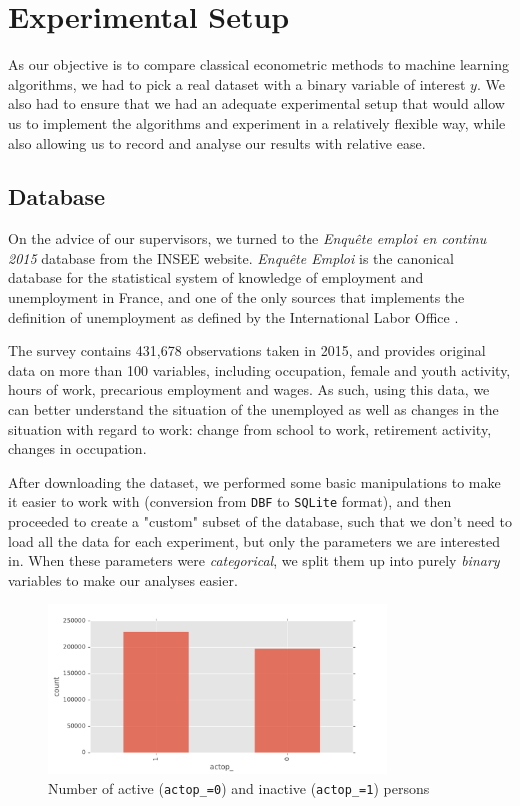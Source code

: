 \chapter{Experimental Setup}

As our objective is to compare classical econometric methods to machine learning algorithms, we had to pick a real dataset with a binary variable of interest $y$. We also had to ensure that we had an adequate experimental setup that would allow us to implement the algorithms and experiment in a relatively flexible way, while also allowing us to record and analyse our results with relative ease.

\section{Database}
On the advice of our supervisors, we turned to the \textit{Enqu\^ete emploi en continu 2015} database \cite{enquete} from the INSEE website. \textit{Enqu\^ete Emploi} is the canonical database for the statistical system of knowledge of employment and unemployment in France, and one of the only sources that implements the definition of unemployment as defined by the International Labor Office \cite{ilo}.

The survey contains 431,678 observations taken in 2015, and provides original data on more than 100 variables, including occupation, female and youth activity, hours of work, precarious employment and wages. As such, using this data, we can better understand the situation of the unemployed as well as changes in the situation with regard to work: change from school to work, retirement activity, changes in occupation.

After downloading the dataset, we performed some basic manipulations to make it easier to work with (conversion from \texttt{DBF} to \texttt{SQLite} format), and then proceeded to create a "custom" subset of the database, such that we don't need to load all the data for each experiment, but only the parameters we are interested in. When these parameters were \textit{categorical}, we split them up into purely \textit{binary} variables to make our analyses easier.

\begin{figure}[!ht]
    \centering
    \includegraphics[width=0.8\textwidth]{img/database_actop_.pdf}
    \caption{Number of active (\texttt{actop\_=0}) and inactive (\texttt{actop\_=1}) persons}
    \label{fig:database_actop_}
\end{figure}

